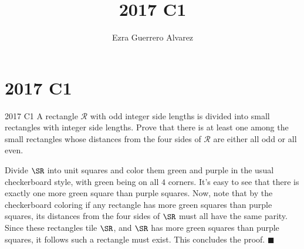 \documentclass[14pt]{article}
\title{2017 C1}
\author{Ezra Guerrero Alvarez}
\begin{document}
\maketitle
	
\section*{2017 C1}

\begin{statement}{2017 C1}
	A rectangle $\mathcal{R}$ with odd integer side lengths is divided into small rectangles with integer side lengths. Prove that there is at least one among the small rectangles whose distances from the four sides of $\mathcal{R}$ are either all odd or all even.
\end{statement}
Divide $\SR$ into unit squares and color them green and purple in the usual checkerboard style, with green being on all $4$ corners. It's easy to see that there is exactly one more green square than purple squares. Now, note that by the checkerboard coloring if any rectangle has more green squares than purple squares, its distances from the four sides of $\SR$ must all have the same parity. Since these rectangles tile $\SR$, and $\SR$ has more green squares than purple squares, it follows such a rectangle must exist. This concludes the proof. $\blacksquare$
	
\end{document}
